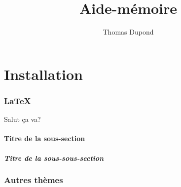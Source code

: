 \documentclass[a4paper, 11pt]{article}
\title{Aide-mémoire}
\author{Thomas Dupond}
\begin{document}
\maketitle
\tableofcontents

\part{Installation}
\section{\LaTeX}

Salut ça va?

\subsection{Titre de la sous-section}

\subsubsection{Titre de la sous-sous-section}

\section{Autres thèmes}
\end{document}
